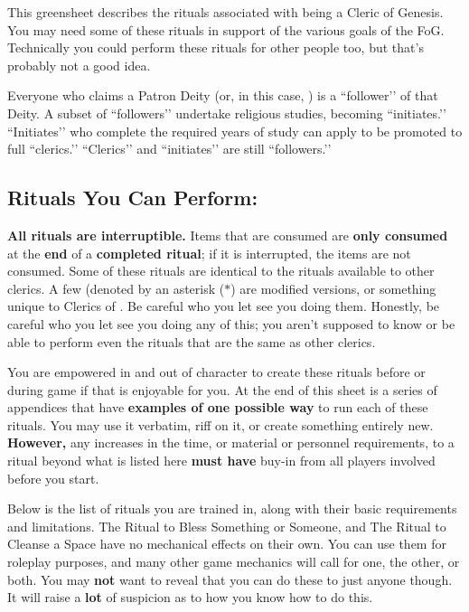 \documentclass[green]{GL2020}
\begin{document}
\name{\gFoGCleric{}}

This greensheet describes the rituals associated with being a Cleric of Genesis. You may need some of these rituals in support of the various goals of the FoG. Technically you could perform these rituals for other people too, but that's probably not a good idea.

Everyone who claims a Patron Deity (or, in this case, \cGenesis{}) is a ``follower’’ of that Deity. A subset of ``followers’’ undertake religious studies, becoming ``initiates.’’ ``Initiates’’ who complete the required years of study can apply to be promoted to full ``clerics.’’ ``Clerics’’ and ``initiates’’ are still ``followers.’’

\subsection*{Rituals You Can Perform:}
\textbf{All rituals are interruptible.} Items that are consumed are \textbf{only consumed }at the \textbf{end} of a \textbf{completed ritual}; if it is interrupted, the items are not consumed. Some of these rituals are identical to the rituals available to other clerics. A few (denoted by an asterisk ($*$) are modified versions, or something unique to Clerics of \cGenesis{}. Be careful who you let see you doing them. Honestly, be careful who you let see you doing any of this; you aren't supposed to know or be able to perform even the rituals that are the same as other clerics.

You are empowered in and out of character to create these rituals before or during game if that is enjoyable for you. At the end of this sheet is a series of appendices that have \textbf{examples of one possible way} to run each of these rituals. You may use it verbatim, riff on it, or create something entirely new. \textbf{However,} any increases in the time, or material or personnel requirements, to a ritual beyond what is listed here \textbf{must have} buy-in from all players involved before you start.

Below is the list of rituals you are trained in, along with their basic requirements and limitations. The Ritual to Bless Something or Someone, and The Ritual to Cleanse a Space have no mechanical effects on their own. You can use them for roleplay purposes, and many other game mechanics will call for one, the other, or both. You may \textbf{not} want to reveal that you can do these to just anyone though. It will raise a \textbf{lot} of suspicion as to how you know how to do this.
\end{document}
